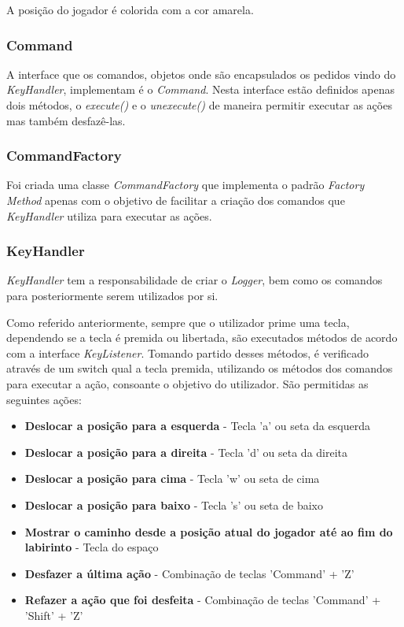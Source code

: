 \documentclass[10pt,portuguese]{article}
\begin{document}
\par A posição do jogador é colorida com a cor amarela.

\subsubsection{Command}

\par A interface que os comandos, objetos onde são encapsulados os pedidos vindo do \textit{KeyHandler}, implementam é o \textit{Command}. Nesta interface estão definidos apenas dois métodos, o \textit{execute()} e o \textit{unexecute()} de maneira permitir executar as ações mas também desfazê-las.

\subsubsection{CommandFactory}

\par Foi criada uma classe \textit{CommandFactory} que implementa o padrão \textit{Factory Method} apenas com o objetivo de facilitar a criação dos comandos que \textit{KeyHandler} utiliza para executar as ações.

\subsubsection{KeyHandler}

\par \textit{KeyHandler} tem a responsabilidade de criar o \textit{Logger}, bem como os comandos para posteriormente serem utilizados por si.

\par Como referido anteriormente, sempre que o utilizador prime uma tecla, dependendo se a tecla é premida ou libertada, são executados métodos de acordo com a interface \textit{KeyListener}. Tomando partido desses métodos, é verificado através de um switch qual a tecla premida, utilizando os métodos dos comandos para executar a ação, consoante o objetivo do utilizador. São permitidas as seguintes ações:

\begin{itemize}
    \item \textbf{Deslocar a posição para a esquerda} - Tecla 'a' ou seta da esquerda
    \item \textbf{Deslocar a posição para a direita} - Tecla 'd' ou seta da direita
    \item \textbf{Deslocar a posição para cima} - Tecla 'w' ou seta de cima
    \item \textbf{Deslocar a posição para baixo} - Tecla 's' ou seta de baixo
    \item \textbf{Mostrar o caminho desde a posição atual do jogador até ao fim do labirinto} - Tecla do espaço
    \item \textbf{Desfazer a última ação} - Combinação de teclas 'Command' + 'Z'
    \item \textbf{Refazer a ação que foi desfeita} - Combinação de teclas 'Command' + 'Shift' + 'Z'
\end{itemize}
\end{document}
